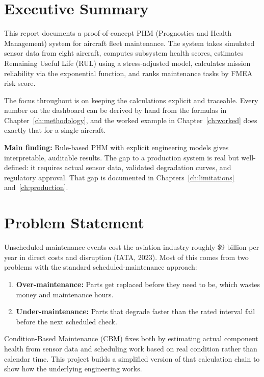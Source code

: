 \documentclass[11pt, a4paper]{report}
\begin{document}
\chapter{Executive Summary}

This report documents a proof-of-concept PHM (Prognostics and Health Management)
system for aircraft fleet maintenance. The system takes simulated sensor data from
eight aircraft, computes subsystem health scores, estimates Remaining Useful Life
(RUL) using a stress-adjusted model, calculates mission reliability via the
exponential function, and ranks maintenance tasks by FMEA risk score.

The focus throughout is on keeping the calculations explicit and traceable. Every
number on the dashboard can be derived by hand from the formulas in
Chapter~\ref{ch:methodology}, and the worked example in Chapter~\ref{ch:worked}
does exactly that for a single aircraft.

\medskip
\noindent\textbf{Main finding:} Rule-based PHM with explicit engineering models
gives interpretable, auditable results. The gap to a production system is real
but well-defined: it requires actual sensor data, validated degradation curves,
and regulatory approval. That gap is documented in Chapters~\ref{ch:limitations}
and~\ref{ch:production}.

\chapter{Problem Statement}

Unscheduled maintenance events cost the aviation industry roughly \$9 billion
per year in direct costs and disruption (IATA, 2023). Most of this comes from
two problems with the standard scheduled-maintenance approach:

\begin{enumerate}
  \item \textbf{Over-maintenance:} Parts get replaced before they need to be,
        which wastes money and maintenance hours.
  \item \textbf{Under-maintenance:} Parts that degrade faster than the rated
        interval fail before the next scheduled check.
\end{enumerate}

Condition-Based Maintenance (CBM) fixes both by estimating actual component
health from sensor data and scheduling work based on real condition rather than
calendar time. This project builds a simplified version of that calculation
chain to show how the underlying engineering works.
\end{document}
